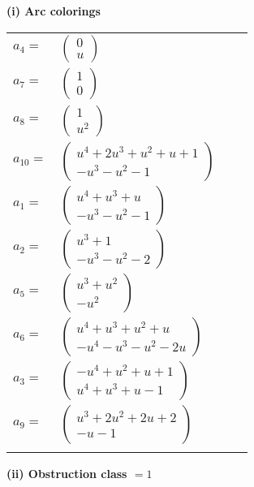 \documentclass[1p]{elsarticle_modified}
\theoremstyle{definition}
\begin{document}
\flushleft \textbf{(i) Arc colorings}\\
\begin{tabular}{m{7pt} m{180pt} m{7pt} m{180pt} }
\flushright $a_{4}=$&$\begin{pmatrix}0\\u\end{pmatrix}$ \\
\flushright $a_{7}=$&$\begin{pmatrix}1\\0\end{pmatrix}$ \\
\flushright $a_{8}=$&$\begin{pmatrix}1\\u^2\end{pmatrix}$ \\
\flushright $a_{10}=$&$\begin{pmatrix}u^4+2 u^3+u^2+u+1\\- u^3- u^2-1\end{pmatrix}$ \\
\flushright $a_{1}=$&$\begin{pmatrix}u^4+u^3+u\\- u^3- u^2-1\end{pmatrix}$ \\
\flushright $a_{2}=$&$\begin{pmatrix}u^3+1\\- u^3- u^2-2\end{pmatrix}$ \\
\flushright $a_{5}=$&$\begin{pmatrix}u^3+u^2\\- u^2\end{pmatrix}$ \\
\flushright $a_{6}=$&$\begin{pmatrix}u^4+u^3+u^2+u\\- u^4- u^3- u^2-2 u\end{pmatrix}$ \\
\flushright $a_{3}=$&$\begin{pmatrix}- u^4+u^2+u+1\\u^4+u^3+u-1\end{pmatrix}$ \\
\flushright $a_{9}=$&$\begin{pmatrix}u^3+2 u^2+2 u+2\\- u-1\end{pmatrix}$\\&\end{tabular}
\flushleft \textbf{(ii) Obstruction class $= 1$}\\~\\
\end{document}
